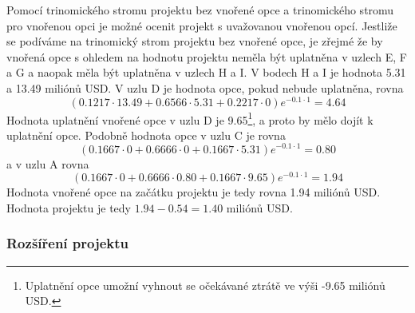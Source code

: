 \documentclass[a4paper]{book}
\begin{document}
Pomocí trinomického stromu projektu bez vnořené opce a trinomického stromu pro vnořenou opci je možné ocenit projekt s uvažovanou vnořenou opcí. Jestliže se podíváme na trinomický strom projektu bez vnořené opce, je zřejmé že by vnořená opce s ohledem na hodnotu projektu neměla být uplatněna v uzlech E, F a G a naopak měla být uplatněna v uzlech H a I. V bodech H a I je hodnota 5.31 a 13.49 miliónů USD. V uzlu D je hodnota opce, pokud nebude uplatněna, rovna
\begin{equation*}
(0.1217 \cdot 13.49 + 0.6566 \cdot 5.31 + 0.2217 \cdot 0)e^{-0.1 \cdot 1} = 4.64
\end{equation*}
Hodnota uplatnění vnořené opce v uzlu D je 9.65\footnote{Uplatnění opce umožní vyhnout se očekávané ztrátě ve výši -9.65 miliónů USD.}, a proto by mělo dojít k uplatnění opce. Podobně hodnota opce v uzlu C je rovna
\begin{equation*}
(0.1667 \cdot 0 + 0.6666 \cdot 0 + 0.1667 \cdot 5.31)e^{-0.1 \cdot 1} = 0.80
\end{equation*}
a v uzlu A rovna
\begin{equation*}
(0.1667 \cdot 0 + 0.6666 \cdot 0.80 + 0.1667 \cdot 9.65)e^{-0.1 \cdot 1} = 1.94
\end{equation*}
Hodnota vnořené opce na začátku projektu je tedy rovna 1.94 miliónů USD. Hodnota projektu je tedy $1.94 - 0.54 = 1.40$ miliónů USD.

\subsubsection{Rozšíření projektu}
\end{document}
